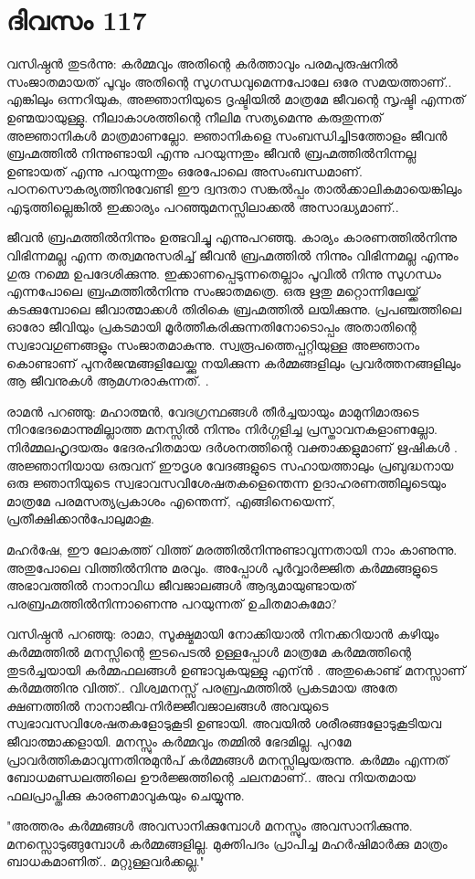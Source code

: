 \newpage
\section{ദിവസം 117}


വസിഷ്ഠന്‍ തുടര്‍ന്നു: കര്‍മ്മവും അതിന്റെ കര്‍ത്താവും പരമപുരുഷനില്‍ സംജാതമായത്‌ പൂവും അതിന്റെ സുഗന്ധവുമെന്നപോലേ ഒരേ സമയത്താണ്‌.. എങ്കിലും ഒന്നറിയുക, അജ്ഞാനിയുടെ ദൃഷ്ടിയില്‍ മാത്രമേ ജീവന്റെ സൃഷ്ടി എന്നത്‌ ഉണ്മയായുള്ളു. നീലാകാശത്തിന്റെ നീലിമ സത്യമെന്നു കരുതുന്നത്‌ അജ്ഞാനികള്‍ മാത്രമാണല്ലോ. ജ്ഞാനികളെ സംബന്ധിച്ചിടത്തോളം ജീവന്‍ ബ്രഹ്മത്തില്‍ നിന്നുണ്ടായി എന്നു പറയുന്നതും ജീവന്‍ ബ്രഹ്മത്തില്‍നിന്നല്ല ഉണ്ടായത്‌ എന്നു പറയുന്നതും ഒരേപോലെ അസംബന്ധമാണ്‌. പഠനസൌകര്യത്തിനുവേണ്ടി ഈ ദ്വന്ദതാ സങ്കല്‍പ്പം താല്‍ക്കാലികമായെങ്കിലും എടുത്തില്ലെങ്കില്‍ ഇക്കാര്യം പറഞ്ഞുമനസ്സിലാക്കല്‍ അസാദ്ധ്യമാണ്‌..

ജീവന്‍ ബ്രഹ്മത്തില്‍നിന്നും ഉത്ഭവിച്ചു എന്നുപറഞ്ഞു. കാര്യം കാരണത്തില്‍നിന്നു വിഭിന്നമല്ല എന്ന തത്വമനുസരിച്ച്‌ ജീവന്‍ ബ്രഹ്മത്തില്‍ നിന്നും വിഭിന്നമല്ല എന്നും ഗുരു നമ്മെ ഉപദേശിക്കുന്നു. ഇക്കാണപ്പെടുന്നതെല്ലാം പൂവില്‍ നിന്നു സുഗന്ധം എന്നപോലെ ബ്രഹ്മത്തില്‍നിന്നു സംജാതമത്രെ. ഒരു ഋതു മറ്റൊന്നിലേയ്ക്ക്‌ കടക്കുമ്പോലെ ജീവാത്മാക്കള്‍ തിരികെ ബ്രഹ്മത്തില്‍ ലയിക്കുന്നു. പ്രപഞ്ചത്തിലെ ഓരോ ജീവിയും പ്രകടമായി മൂര്‍ത്തീകരിക്കുന്നതിനോടൊപ്പം അതാതിന്റെ സ്വഭാവഗുണങ്ങളും സംജാതമാകുന്നു. സ്വരൂപത്തെപ്പറ്റിയുള്ള അജ്ഞാനം കൊണ്ടാണ്‌ പുനര്‍ജന്മങ്ങളിലേയ്ക്കു നയിക്കുന്ന കര്‍മ്മങ്ങളിലും പ്രവര്‍ത്തനങ്ങളിലും ആ ജീവനുകള്‍ ആമഗ്നരാകുന്നത്‌. .

രാമന്‍ പറഞ്ഞു: മഹാത്മന്‍, വേദഗ്രന്ഥങ്ങള്‍ തീര്‍ച്ചയായും മാമുനിമാരുടെ നിറഭേദമൊന്നുമില്ലാത്ത മനസ്സില്‍ നിന്നും നിര്‍ഗ്ഗളിച്ച പ്രസ്താവനകളാണല്ലോ. നിര്‍മ്മലഹൃദയരും ഭേദരഹിതമായ ദര്‍ശനത്തിന്റെ വക്താക്കളുമാണ്‌ ഋഷികള്‍ .  അജ്ഞാനിയായ ഒരുവന്‌ ഈദൃശ വേദങ്ങളുടെ സഹായത്താലും പ്രബുദ്ധനായ ഒരു ജ്ഞാനിയുടെ സ്വഭാവസവിശേഷതകളെന്തെന്ന ഉദാഹരണത്തിലൂടെയും മാത്രമേ പരമസത്യപ്രകാശം എന്തെന്ന്, എങ്ങിനെയെന്ന്, പ്രതീക്ഷിക്കാന്‍പോലുമാകൂ.

മഹര്‍ഷേ, ഈ ലോകത്ത്‌ വിത്ത്‌ മരത്തില്‍നിന്നുണ്ടാവുന്നതായി നാം കാണുന്നു. അതുപോലെ വിത്തില്‍നിന്നു മരവും. അപ്പോള്‍ പൂര്‍വ്വാര്‍ജ്ജിത കര്‍മ്മങ്ങളുടെ അഭാവത്തില്‍ നാനാവിധ ജീവജാലങ്ങള്‍ ആദ്യമായുണ്ടായത്‌ പരബ്രഹ്മത്തില്‍നിന്നാണെന്നു പറയുന്നത്‌ ഉചിതമാകുമോ?

വസിഷ്ഠന്‍ പറഞ്ഞു: രാമാ, സൂക്ഷ്മമായി നോക്കിയാല്‍ നിനക്കറിയാന്‍ കഴിയും കര്‍മ്മത്തില്‍ മനസ്സിന്റെ ഇടപെടല്‍ ഉള്ളപ്പോള്‍ മാത്രമേ കര്‍മ്മത്തിന്റെ തുടര്‍ച്ചയായി കര്‍മ്മഫലങ്ങള്‍ ഉണ്ടാവുകയുള്ളു എന്ന്‍ . അതുകൊണ്ട്‌ മനസ്സാണ്‌ കര്‍മ്മത്തിനു വിത്ത്‌.. വിശ്വമനസ്സ്‌ പരബ്രഹ്മത്തില്‍ പ്രകടമായ അതേ ക്ഷണത്തില്‍ നാനാജീവ-നിര്‍ജ്ജീവജാലങ്ങള്‍ അവയുടെ സ്വഭാവസവിശേഷതകളോടുകൂടി ഉണ്ടായി. അവയില്‍ ശരീരങ്ങളോടുകൂടിയവ ജീവാത്മാക്കളായി. മനസ്സും കര്‍മ്മവും തമ്മില്‍ ഭേദമില്ല. പുറമേ പ്രാവര്‍ത്തികമാവുന്നതിനുമുന്‍പ്‌ കര്‍മ്മങ്ങള്‍ മനസ്സിലുയരുന്നു. കര്‍മ്മം എന്നത്‌ ബോധമണ്ഡലത്തിലെ ഊര്‍ജ്ജത്തിന്റെ ചലനമാണ്‌.. അവ നിയതമായ ഫലപ്രാപ്തിക്കു കാരണമാവുകയും ചെയ്യുന്നു.

"അത്തരം കര്‍മ്മങ്ങള്‍ അവസാനിക്കുമ്പോള്‍ മനസ്സും അവസാനിക്കുന്നു. മനസ്സൊടുങ്ങുമ്പോള്‍ കര്‍മ്മങ്ങളില്ല. മുക്തിപദം പ്രാപിച്ച മഹര്‍ഷിമാര്‍ക്കു മാത്രം ബാധകമാണിത്‌.. മറ്റുള്ളവര്‍ക്കല്ല."
